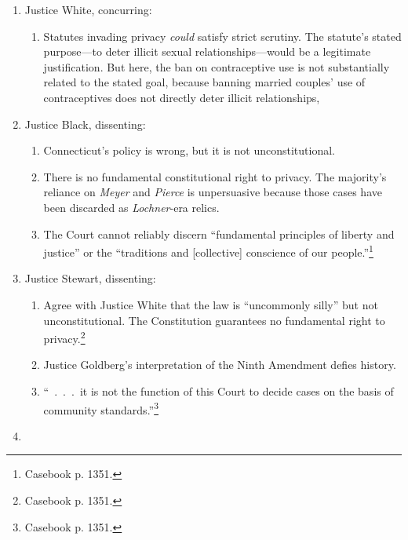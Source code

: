 \begin{enumerate}
\begin{enumerate}
        the specific guarantees elsewhere provided by the 
        Constitution.~.~.~.~It is a rational continuum which, broadly 
        speaking, includes a freedom from all substantial arbitrary 
        impositions and purposeless restraints.''\footnote{Casebook p. 1347.}
        \item Statutes regulating fundamental rights, such as privacy, are 
        subject to strict scrutiny.\footnote{Casebook p. 1347.} Connecticut 
        failed to show a compelling government interest because it has failed 
        to enforce the statute against individual users.\footnote{Casebook p. 
        1148.}
    \end{enumerate}
    \item Justice White, concurring:
    \begin{enumerate}
        \item Statutes invading privacy \emph{could} satisfy strict scrutiny. 
        The statute's stated purpose---to deter illicit sexual 
        relationships---would be a legitimate justification. But here, the ban 
        on contraceptive use is not substantially related to the stated goal, 
        because banning married couples' use of contraceptives does not 
        directly deter illicit relationships,
    \end{enumerate}
    \item Justice Black, dissenting:
    \begin{enumerate}
       \item Connecticut's policy is wrong, but it is not unconstitutional.
       \item There is no fundamental constitutional right to privacy. The 
       majority's reliance on \emph{Meyer} and \emph{Pierce} is unpersuasive 
       because those cases have been discarded as \emph{Lochner}-era relics.
        \item The Court cannot reliably discern ``fundamental principles of 
        liberty and justice'' or the ``traditions and [collective] conscience 
        of our people.''\footnote{Casebook p. 1351.}
    \end{enumerate}
    \item Justice Stewart, dissenting:
    \begin{enumerate}
        \item Agree with Justice White that the law is ``uncommonly silly'' 
        but not unconstitutional. The Constitution guarantees no fundamental 
        right to privacy.\footnote{Casebook p. 1351.}
        \item Justice Goldberg's interpretation of the Ninth Amendment defies 
        history.
        \item ``~.~.~.~it is not the function of this Court to decide cases on 
        the basis of community standards.''\footnote{Casebook p. 1351.}
    \end{enumerate}
    \item 
\end{enumerate}

